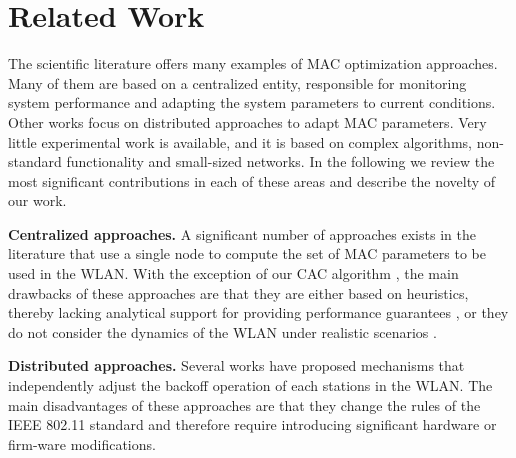 \documentclass[a4paper,10pt]{article}
\begin{document}
\vspace{0.5em}
\section{Related Work}
\label{sec:related}

The scientific literature offers many examples of MAC optimization approaches. Many of them are based on a centralized entity, responsible for monitoring system performance and adapting the system parameters to current conditions. Other works focus on distributed approaches to adapt MAC parameters. Very little experimental work is available, and it is based on complex algorithms, non-standard functionality and small-sized networks. In the following we review the most significant contributions in each of these areas and describe the novelty of our work. 

\vspace{0.5em}
{\bf Centralized approaches.} A significant number of approaches exists in the literature \cite{freitag06,nafaa05,siris06,patras09monet} that use a single node to compute the set of MAC parameters to be used in the WLAN. With the exception of our CAC algorithm \cite{patras09monet}, the main drawbacks of these approaches are that they are either based on heuristics, thereby lacking analytical support for providing performance guarantees \cite{freitag06,nafaa05}, or they do not consider the dynamics of the WLAN under realistic scenarios \cite{siris06}.

\vspace{0.5em}
{\bf Distributed approaches.} Several works \cite{yang07,ni03,heusse05,AOBorig,cali00} have proposed mechanisms that independently adjust the backoff operation of each stations in the WLAN. The main disadvantages of these approaches are that they change the rules of the IEEE 802.11 standard and therefore require introducing significant hardware or firm-ware modifications.
\end{document}
